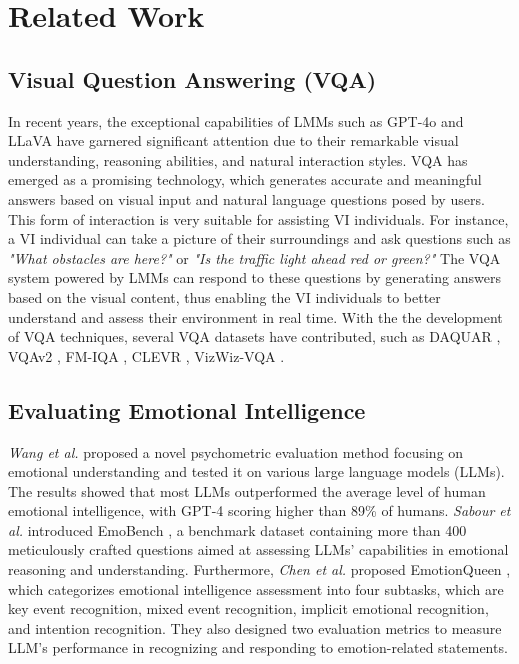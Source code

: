 \section{Related Work}
\subsection{Visual Question Answering (VQA)}
In recent years, the exceptional capabilities of LMMs such as GPT-4o and LLaVA have garnered significant attention due to their remarkable visual understanding, reasoning abilities, and natural interaction styles. VQA has emerged as a promising technology, which generates accurate and meaningful answers based on visual input and natural language questions posed by users. This form of interaction is very suitable for assisting VI individuals. For instance, a VI individual can take a picture of their surroundings and ask questions such as \textit{"What obstacles are here?"} or \textit{"Is the traffic light ahead red or green?"} The VQA system powered by LMMs can respond to these questions by generating answers based on the visual content, thus enabling the VI individuals to better understand and assess their environment in real time. With the the development of VQA techniques, several VQA datasets have contributed, such as DAQUAR \cite{9}, VQAv2 \cite{10}, FM-IQA \cite{11}, CLEVR \cite{12}, VizWiz-VQA \cite{13}.

\subsection{Evaluating Emotional Intelligence }
\textit{Wang et al.} \cite{40} proposed a novel psychometric evaluation method focusing on emotional understanding and tested it on various large language models (LLMs). The results showed that most LLMs outperformed the average level of human emotional intelligence, with GPT-4 scoring higher than 89\% of humans. \textit{Sabour et al.} introduced EmoBench \cite{41}, a benchmark dataset containing more than 400 meticulously crafted questions aimed at assessing LLMs’ capabilities in emotional reasoning and understanding. Furthermore, \textit{Chen et al.} proposed EmotionQueen \cite{26}, which categorizes emotional intelligence assessment into four subtasks, which are key event recognition, mixed event recognition, implicit emotional recognition, and intention recognition. They also designed two evaluation metrics to measure LLM's performance in recognizing and responding to emotion-related statements.

